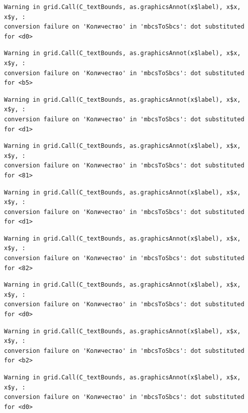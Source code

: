 \documentclass[
  letterpaper,
]{scrbook}
\theoremstyle{definition}
\theoremstyle{remark}
\begin{document}
\begin{verbatim}
Warning in grid.Call(C_textBounds, as.graphicsAnnot(x$label), x$x, x$y, :
conversion failure on 'Количество' in 'mbcsToSbcs': dot substituted for <d0>
\end{verbatim}

\begin{verbatim}
Warning in grid.Call(C_textBounds, as.graphicsAnnot(x$label), x$x, x$y, :
conversion failure on 'Количество' in 'mbcsToSbcs': dot substituted for <b5>
\end{verbatim}

\begin{verbatim}
Warning in grid.Call(C_textBounds, as.graphicsAnnot(x$label), x$x, x$y, :
conversion failure on 'Количество' in 'mbcsToSbcs': dot substituted for <d1>
\end{verbatim}

\begin{verbatim}
Warning in grid.Call(C_textBounds, as.graphicsAnnot(x$label), x$x, x$y, :
conversion failure on 'Количество' in 'mbcsToSbcs': dot substituted for <81>
\end{verbatim}

\begin{verbatim}
Warning in grid.Call(C_textBounds, as.graphicsAnnot(x$label), x$x, x$y, :
conversion failure on 'Количество' in 'mbcsToSbcs': dot substituted for <d1>
\end{verbatim}

\begin{verbatim}
Warning in grid.Call(C_textBounds, as.graphicsAnnot(x$label), x$x, x$y, :
conversion failure on 'Количество' in 'mbcsToSbcs': dot substituted for <82>
\end{verbatim}

\begin{verbatim}
Warning in grid.Call(C_textBounds, as.graphicsAnnot(x$label), x$x, x$y, :
conversion failure on 'Количество' in 'mbcsToSbcs': dot substituted for <d0>
\end{verbatim}

\begin{verbatim}
Warning in grid.Call(C_textBounds, as.graphicsAnnot(x$label), x$x, x$y, :
conversion failure on 'Количество' in 'mbcsToSbcs': dot substituted for <b2>
\end{verbatim}

\begin{verbatim}
Warning in grid.Call(C_textBounds, as.graphicsAnnot(x$label), x$x, x$y, :
conversion failure on 'Количество' in 'mbcsToSbcs': dot substituted for <d0>
\end{verbatim}
\end{document}
